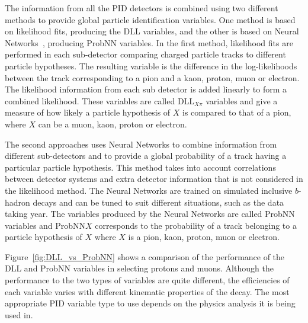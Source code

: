 The information from all the PID detectors is combined using two different methods to provide global particle identification variables. One method is based on likelihood fits, producing the DLL variables, and the other is based on Neural Networks~\cite{Feindt:2006pm}, producing ProbNN variables. In the first method, likelihood fits are performed in each sub-detector comparing charged particle tracks to different particle hypotheses. The resulting variable is the difference in the log-likelihoods between the track corresponding to a pion and a kaon, proton, muon or electron. The likelihood information from each sub detector is added linearly to form a combined likelihood. 
These variables are called DLL$_{X\pi}$ variables and give a measure of how likely a particle hypothesis of $X$ is compared to that of a pion, where $X$ can be a muon, kaon, proton or electron.

The second approaches uses Neural Networks to combine information from different sub-detectors and to provide a global probability of a track having a particular particle hypothesis. This method takes into account correlations between detector systems and extra detector information that is not considered in the likelihood method. The Neural Networks are trained on simulated inclusive $b$-hadron decays and can be tuned to suit different situations, such as the data taking year. The variables produced by the Neural Networks are called ProbNN variables and ProbNN$X$ corresponds to the probability of a track belonging to a particle hypothesis of $X$ where $X$ is a pion, kaon, proton, muon or electron. 

Figure~\ref{fig:DLL_vs_ProbNN} shows a comparison of the performance of the DLL and ProbNN variables in selecting protons and muons. Although the performance to the two types of variables are quite different, the efficiencies of each variable varies with different kinematic properties of the decay. The most appropriate PID variable type to use depends on the physics analysis it is being used in. 

